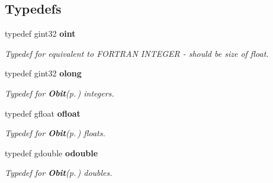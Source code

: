 \subsection*{Typedefs}
\begin{CompactItemize}
\item 
typedef gint32 {\bf oint}
\begin{CompactList}\small\item\em Typedef for equivalent to FORTRAN INTEGER - should be size of float. \item\end{CompactList}\item 
typedef gint32 {\bf olong}
\begin{CompactList}\small\item\em Typedef for {\bf Obit}{\rm (p.\,\pageref{structObit})} integers. \item\end{CompactList}\item 
typedef gfloat {\bf ofloat}
\begin{CompactList}\small\item\em Typedef for {\bf Obit}{\rm (p.\,\pageref{structObit})} floats. \item\end{CompactList}\item 
typedef gdouble {\bf odouble}
\begin{CompactList}\small\item\em Typedef for {\bf Obit}{\rm (p.\,\pageref{structObit})} doubles. \item\end{CompactList}\end{CompactItemize}
